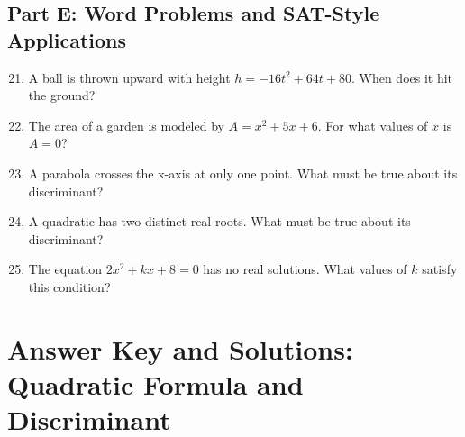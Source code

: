 \documentclass[14pt]{extarticle}
\begin{document}
\subsection*{Part E: Word Problems and SAT-Style Applications}
\begin{enumerate}
  \setcounter{enumi}{20}
  \item A ball is thrown upward with height \(h = -16t^2 + 64t + 80.\) When does it hit the ground?
  \item The area of a garden is modeled by \(A = x^2 + 5x + 6.\) For what values of \(x\) is \(A = 0\)?
  \item A parabola crosses the x-axis at only one point. What must be true about its discriminant?
  \item A quadratic has two distinct real roots. What must be true about its discriminant?
  \item The equation \(2x^2 + kx + 8 = 0\) has no real solutions. What values of \(k\) satisfy this condition?
\end{enumerate}

\newpage


\section*{Answer Key and Solutions: Quadratic Formula and Discriminant}
\end{document}
